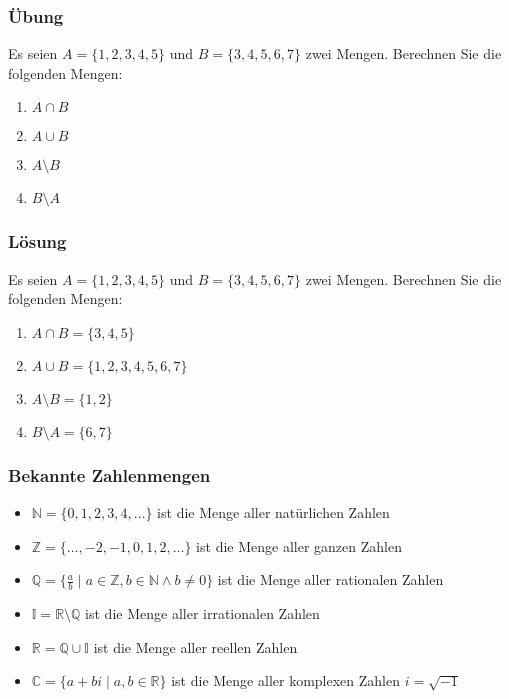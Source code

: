 \begin{frame}
    \frametitle{Übung}
    Es seien $A = \{1,2,3,4,5\}$ und $B = \{3,4,5,6,7\}$ zwei Mengen.
    Berechnen Sie die folgenden Mengen:
    \begin{enumerate}
        \vfill \item $A \cap B$
        \vfill \item $A \cup B$
        \vfill \item $A \setminus B$
        \vfill \item $B \setminus A$
    \end{enumerate}
\end{frame}

\begin{frame}
    \frametitle{Lösung}
    Es seien $A = \{1,2,3,4,5\}$ und $B = \{3,4,5,6,7\}$ zwei Mengen.
    Berechnen Sie die folgenden Mengen:
    \begin{enumerate}
        \vfill \item $A \cap B = \{3,4,5\}$
        \vfill \item $A \cup B = \{1,2,3,4,5,6,7\}$
        \vfill \item $A \setminus B = \{1,2\}$
        \vfill \item $B \setminus A = \{6,7\}$
    \end{enumerate}
\end{frame}

\begin{frame}
    \frametitle{Bekannte Zahlenmengen}
    \begin{itemize}
        \vfill \item $\mathbb{N} = \{0,1,2,3,4, \dots\}$ ist die Menge aller natürlichen Zahlen
        \vfill \item $\mathbb{Z} = \{\dots, -2, -1, 0, 1, 2, \dots\}$ ist die Menge aller ganzen Zahlen
        \vfill \item $\mathbb{Q} = \{\frac{a}{b} \mid a \in \mathbb{Z}, b \in \mathbb{N} \wedge b \neq 0\}$ ist die Menge aller rationalen Zahlen
        \vfill \item $\mathbb{I} = \mathbb{R} \setminus \mathbb{Q}$ ist die Menge aller irrationalen Zahlen
        \vfill \item $\mathbb{R} = \mathbb{Q} \cup  \mathbb{I}$ ist die Menge aller reellen Zahlen
        \vfill \item $\mathbb{C} = \{a + bi \mid a, b \in \mathbb{R}\}$ ist die Menge aller komplexen Zahlen $i = \sqrt{-1}$
    \end{itemize}
\end{frame}
